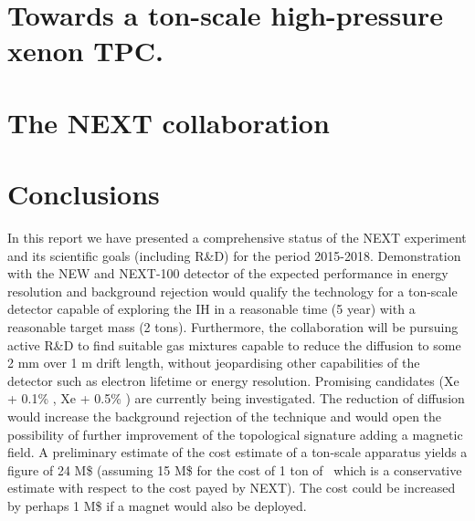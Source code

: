 \documentclass[a4paper, 11pt]{article}
\begin{document}
\section{Towards a ton-scale high-pressure xenon TPC.}
\label{sec.ts}


\section{The NEXT collaboration}
\label{sec.nc}
 

 \section{Conclusions}
 \label{sec.conclu}
 In this report we have presented a comprehensive status of the NEXT experiment and its  scientific goals (including R\&D) for the period 2015-2018. Demonstration with the NEW and NEXT-100 detector of the expected performance in energy resolution and background rejection would qualify the technology for a ton-scale detector capable of exploring the IH in a reasonable time (5 year) with a reasonable target mass (2 tons). Furthermore, the collaboration will be pursuing active R\&D to find suitable gas mixtures capable to reduce the diffusion to some 2 mm over 1 m drift length, without jeopardising other capabilities of the detector such as electron lifetime or energy resolution. Promising candidates (Xe + 0.1\% \COT, Xe + 0.5\% \CHF) are currently being investigated. The reduction of diffusion would increase the background rejection of the technique and would open the possibility of further improvement of the topological signature adding a magnetic field. A preliminary estimate of the cost estimate of a ton-scale apparatus yields a figure of 24 M\$ (assuming 15 M\$ for the cost of 1 ton of \XE\ which is a conservative estimate with respect to the cost payed by NEXT). The cost could be increased by perhaps 1 M\$ if a magnet would also be deployed.  
 
 \nocite{*}


\end{document}
